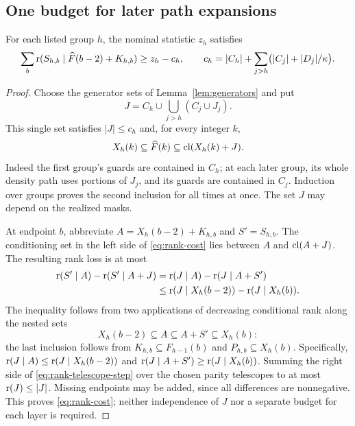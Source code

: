 \subsection{One budget for later path expansions}

\begin{lemma}\label{lem:rank-cost}
For each listed group $h$, the nominal statistic $z_h$ satisfies
\begin{equation}\label{eq:rank-cost}
 \sum_b\operatorname{r}(S_{h,b}\mid\widehat F(b-2)+K_{h,b})\ge z_h-c_h,
 \qquad
 c_h=|C_h|+\sum_{j>h}\bigl(|C_j|+|D_j|/\kappa\bigr).
\end{equation}
\end{lemma}
\begin{proof}
Choose the generator sets of Lemma~\ref{lem:generators} and put
\[
 J=C_h\cup\bigcup_{j>h}(C_j\cup J_j).
\]
This single set satisfies $|J|\le c_h$ and, for every integer $k$,
\begin{equation}\label{eq:common-generator-set}
 X_h(k)\subseteq\widehat F(k)\subseteq\operatorname{cl}(X_h(k)+J).
\end{equation}
Indeed the first group's guards are contained in $C_h$; at each later
group, its whole density path uses portions of $J_j$, and its guards
are contained in $C_j$. Induction over groups proves the second inclusion
for all times at once. The set $J$ may depend on the realized masks.

At endpoint $b$, abbreviate $A=X_h(b-2)+K_{h,b}$ and $S'=S_{h,b}$.
The conditioning set in the left side of \eqref{eq:rank-cost} lies
between $A$ and $\operatorname{cl}(A+J)$. The resulting rank loss is at most
\begin{align}
 \operatorname{r}(S'\mid A)-\operatorname{r}(S'\mid A+J)
 &=\operatorname{r}(J\mid A)-\operatorname{r}(J\mid A+S')\notag\\
 &\le\operatorname{r}(J\mid X_h(b-2))-\operatorname{r}(J\mid X_h(b)).
 \label{eq:rank-telescope-step}
\end{align}
The inequality follows from two applications of decreasing conditional
rank along the nested sets
\[
 X_h(b-2)\subseteq A\subseteq A+S'\subseteq X_h(b):
\]
the last inclusion follows from $K_{h,b}\subseteq F_{h-1}(b)$ and
$P_{h,b}\subseteq X_h(b)$. Specifically,
$\operatorname{r}(J\mid A)\le\operatorname{r}(J\mid X_h(b-2))$ and
$\operatorname{r}(J\mid A+S')\ge\operatorname{r}(J\mid X_h(b))$.
Summing the right side of
\eqref{eq:rank-telescope-step} over the chosen parity telescopes to at most
$\operatorname{r}(J)\le |J|$. Missing endpoints may be added, since all differences
are nonnegative. This proves \eqref{eq:rank-cost}; neither independence
of $J$ nor a separate budget for each layer is required.
\end{proof}

